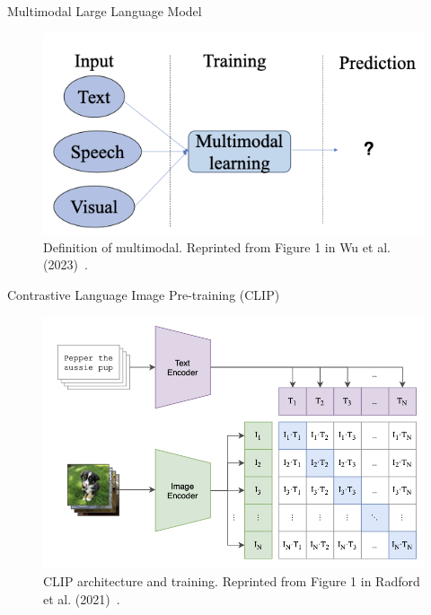 \documentclass[12pt]{beamer}
\begin{document}
\begin{frame}[allowframebreaks]{Multimodal Large Language Model}
    \begin{figure}
        \centering
        \includegraphics[width=0.9\linewidth]{figures/multimodal_definition.png}
        \caption{Definition of multimodal. Reprinted from Figure 1 in Wu et al. (2023)~\cite{10386743}.}
        \label{fig:Fig. 7}
    \end{figure}
\end{frame}

\begin{frame}[allowframebreaks]{Contrastive Language Image Pre-training (CLIP)}
    \begin{figure}
        \centering
        \includegraphics[height=0.5\textheight]{figures/clip.png}
        \caption{CLIP architecture and training. Reprinted from Figure 1 in Radford et al. (2021)~\cite{pmlr-v139-radford21a}.}
        \label{fig:Fig. 8}
    \end{figure}
\end{frame}
\end{document}
